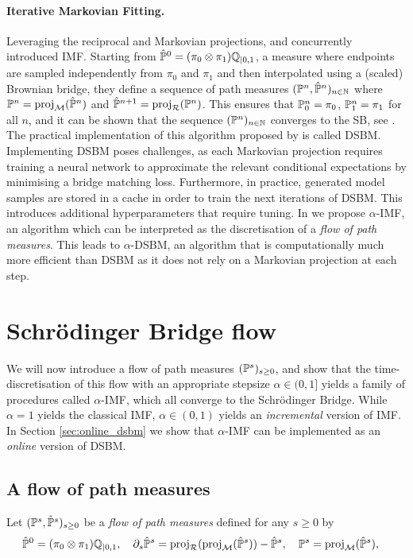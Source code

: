 \documentclass{article}
\begin{document}
\paragraph{Iterative Markovian Fitting.} Leveraging the reciprocal and Markovian projections, \citet{peluchetti_diffusion_2023} and \citet{shi2023DSBM} concurrently introduced IMF. Starting from $\hat{\mathbb{P}}^0 = (\pi_0 \otimes \pi_1) \mathbb{Q}_{|0,1}$, a measure where endpoints are sampled independently from $\pi_0$ and $\pi_1$ and then interpolated using a (scaled) Brownian bridge, they define a sequence of path measures $(\mathbb{P}^n, \hat{\mathbb{P}}^n)_{n \in \mathbb{N}}$ where $\mathbb{P}^{n} = \mathrm{proj}_{\mathcal{M}}(\hat{\mathbb{P}}^{n})$ and $\hat{\mathbb{P}}^{n+1} = \mathrm{proj}_{\mathcal{R}}(\mathbb{P}^{n})$. This ensures that $\mathbb{P}^n_0 = \pi_0$, $\mathbb{P}^n_1 = \pi_1$ for all $n$, and it can be shown that the sequence $(\mathbb{P}^n)_{n \in \mathbb{N}}$ converges to the SB, see \cite[Theorem 2]{peluchetti_diffusion_2023}. The practical implementation of this algorithm proposed by \cite{shi2023DSBM} is called DSBM. Implementing DSBM poses challenges, as each Markovian projection requires training a neural network to approximate the relevant conditional expectations by minimising a bridge matching loss. Furthermore, in practice, generated model samples are stored in a cache in order to train the next iterations of DSBM. This introduces additional hyperparameters that require tuning. In  we propose $\alpha$-IMF, an algorithm which can be interpreted as the discretisation of a \emph{flow of path measures}. This leads to $\alpha$-DSBM, an algorithm that is computationally much more efficient than DSBM as it does not rely on a Markovian projection at each step. 

\section{Schr\"odinger Bridge flow}
\label{sec:theoretical_results}

We will now introduce a flow of path measures $(\mathbb{P}^s)_{s \geq 0}$, and show that the time-discretisation of this flow with an appropriate stepsize $\alpha \in (0,1]$ yields a family of procedures called $\alpha$-IMF, which all converge to the Schr\"odinger Bridge.  While $\alpha=1$ yields the classical IMF, $\alpha \in (0,1)$ yields an \emph{incremental} version of IMF. In Section \ref{sec:online_dsbm} we show that $\alpha$-IMF can be implemented as an \emph{online} version of DSBM.

\subsection{A flow of path measures} Let $(\mathbb{P}^s, \hat{\mathbb{P}}^s)_{s \geq 0}$ be a \emph{flow of path measures} defined for any $s \geq 0$ by
\begin{align}
    &\hat{\Pbb}^0 = (\pi_0 \otimes \pi_1) \Qbb_{|0,1}, \quad \partial_s \hat{\Pbb}^s = \projsimpleR(\projM(\hat{\Pbb}^s)) -\hat{\Pbb}^s , \quad \Pbb^s = \projM(\hat{\Pbb}^s), \label{eq:flow_hat_p}
\end{align}
\end{document}
